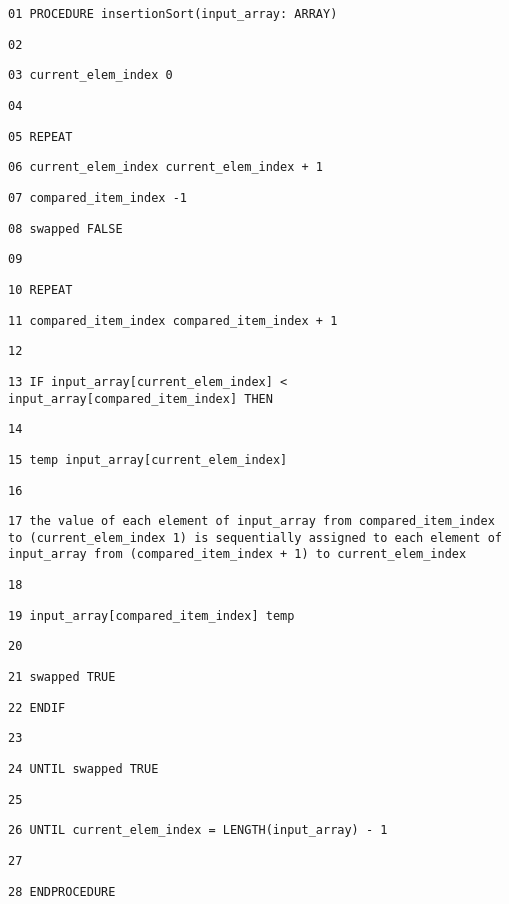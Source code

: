 \noindent %
\noindent\begin{minipage}[t]{1\columnwidth}%
\texttt{01 PROCEDURE insertionSort(input\_array: ARRAY) }

\texttt{02 }

\texttt{03 \qquad{}current\_elem\_index \textleftarrow{} 0 }

\texttt{04 }

\texttt{05 \qquad{}REPEAT }

\texttt{06 \qquad{}\qquad{}current\_elem\_index \textleftarrow{}
current\_elem\_index + 1 }

\texttt{07 \qquad{}\qquad{}compared\_item\_index \textleftarrow{}
-1 }

\texttt{08 \qquad{}\qquad{}swapped \textleftarrow{} FALSE }

\texttt{09 }

\texttt{10 \qquad{}\qquad{}REPEAT }

\texttt{11 \qquad{}\qquad{}\qquad{}compared\_item\_index \textleftarrow{}
compared\_item\_index + 1 }

\texttt{12 }

\texttt{13 \qquad{}\qquad{}\qquad{}IF input\_array{[}current\_elem\_index{]}
< input\_array{[}compared\_item\_index{]} THEN }

\texttt{14 }

\texttt{15 \qquad{}\qquad{}\qquad{}\qquad{}temp \textleftarrow{}
input\_array{[}current\_elem\_index{]}}

\texttt{16 }

\texttt{17 \qquad{}\qquad{}\qquad{}\qquad{}the value of each element
of input\_array from compared\_item\_index to (current\_elem\_index
\textendash{} 1) is sequentially assigned to each element of input\_array
from (compared\_item\_index + 1) to current\_elem\_index}

\texttt{18 }

\texttt{19 \qquad{}\qquad{}\qquad{}\qquad{}input\_array{[}compared\_item\_index{]}
\textleftarrow{} temp }

\texttt{20 }

\texttt{21 \qquad{}\qquad{}\qquad{}\qquad{}swapped \textleftarrow{}
TRUE }

\texttt{22 \qquad{}\qquad{}\qquad{}ENDIF }

\texttt{23 }

\texttt{24 \qquad{}\qquad{}UNTIL swapped \textleftarrow{} TRUE }

\texttt{25 }

\texttt{26 \qquad{}UNTIL current\_elem\_index = LENGTH(input\_array)
- 1 }

\texttt{27 }

\texttt{28 ENDPROCEDURE }%
\end{minipage}
